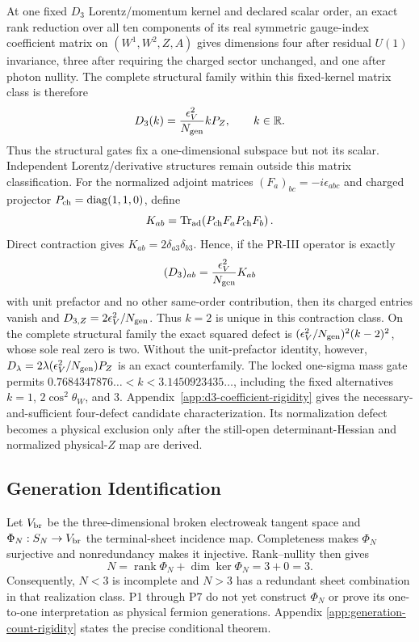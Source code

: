 At one fixed $D_3$ Lorentz/momentum kernel and declared scalar order, an exact
rank reduction over all ten components of its real symmetric gauge-index
coefficient matrix on $(W^1,W^2,Z,A)$ gives dimensions four after residual
$U(1)$ invariance, three after requiring the charged sector unchanged, and one
after photon nullity.  The complete structural family within this fixed-kernel
matrix class is therefore
\begin{equation}
 D_3(k)=\frac{\epsilon_V^2}{N_{\rm gen}}kP_Z,
 \qquad k\in\mathbb R.
\end{equation}
Thus the structural gates fix a one-dimensional subspace but not its scalar.
Independent Lorentz/derivative structures remain outside this matrix
classification.  For the normalized
adjoint matrices $(F_a)_{bc}=-i\epsilon_{abc}$ and charged projector
$P_{\rm ch}=\operatorname{diag}(1,1,0)$, define
\begin{equation}
 K_{ab}=\operatorname{Tr}_{\rm ad}
 \!\left(P_{\rm ch}F_aP_{\rm ch}F_b\right).
\end{equation}
Direct contraction gives $K_{ab}=2\delta_{a3}\delta_{b3}$.  Hence, if the
PR-III operator is exactly
\begin{equation}
 (D_3)_{ab}=\frac{\epsilon_V^2}{N_{\rm gen}}K_{ab}
\end{equation}
with unit prefactor and no other same-order contribution, then its charged
entries vanish and $D_{3,Z}=2\epsilon_V^2/N_{\rm gen}$.  Thus $k=2$ is unique
in this contraction class.  On the complete structural family the exact
squared defect is
$(\epsilon_V^2/N_{\rm gen})^2(k-2)^2$, whose sole real zero is two.  Without
the unit-prefactor identity, however,
$D_\lambda=2\lambda(\epsilon_V^2/N_{\rm gen})P_Z$ is an exact counterfamily.
The locked one-sigma mass gate permits
$0.7684347876\ldots<k<3.1450923435\ldots$, including the fixed alternatives $k=1$, $2\cos^2\theta_W$, and $3$. Appendix~\ref{app:d3-coefficient-rigidity} gives the necessary-and-sufficient four-defect candidate characterization.  Its normalization defect becomes a physical exclusion only after the still-open determinant-Hessian and normalized physical-$Z$ map are derived.

\subsection{Generation Identification}

Let $V_{\rm br}$ be the three-dimensional broken electroweak tangent space and
$\Phi_N:S_N\to V_{\rm br}$ the terminal-sheet incidence map.  Completeness
makes $\Phi_N$ surjective and nonredundancy makes it injective.  Rank--nullity
then gives
\begin{equation}
 N=\operatorname{rank}\Phi_N+\dim\ker\Phi_N=3+0=3.
\end{equation}
Consequently, $N<3$ is incomplete and $N>3$ has a redundant sheet combination
in that realization class.  P1 through P7 do not yet construct $\Phi_N$ or prove its one-to-one interpretation as physical fermion generations.  Appendix
\ref{app:generation-count-rigidity} states the precise conditional theorem.

